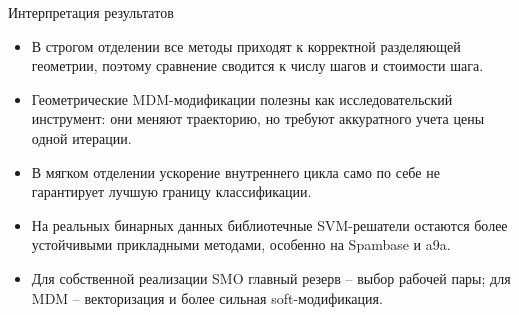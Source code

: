 \SPBGContentSlide
  {Интерпретация результатов}
  {%
    \Body
    \begin{itemize}
      \item В строгом отделении все методы приходят к корректной разделяющей
      геометрии, поэтому сравнение сводится к числу шагов и стоимости шага.
      \item Геометрические MDM-модификации полезны как исследовательский
      инструмент: они меняют траекторию, но требуют аккуратного учета цены
      одной итерации.
      \item В мягком отделении ускорение внутреннего цикла само по себе не
      гарантирует лучшую границу классификации.
      \item На реальных бинарных данных библиотечные SVM-решатели остаются
      более устойчивыми прикладными методами, особенно на Spambase и a9a.
      \item Для собственной реализации SMO главный резерв -- выбор рабочей
      пары; для MDM -- векторизация и более сильная soft-модификация.
    \end{itemize}
  }
